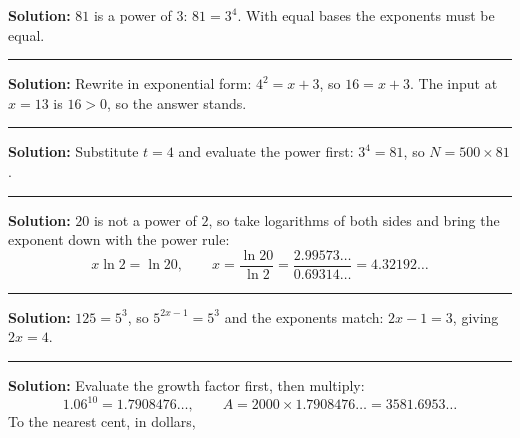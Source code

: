 \documentclass[12pt]{article}
\begin{document}



\textbf{Solution:} $81$ is a power of $3$: $81 = 3^4$. With equal bases the
exponents must be equal. 

\vspace{0.2cm}\noindent\rule{\linewidth}{0.2pt}\vspace{0.2cm}


\textbf{Solution:} Rewrite in exponential form: $4^2 = x + 3$, so
$16 = x + 3$. The input at $x = 13$ is $16 > 0$, so the answer stands.

\vspace{0.2cm}\noindent\rule{\linewidth}{0.2pt}\vspace{0.2cm}


\textbf{Solution:} Substitute $t = 4$ and evaluate the power first:
$3^4 = 81$, so $N = 500 \times 81$. 

\vspace{0.2cm}\noindent\rule{\linewidth}{0.2pt}\vspace{0.2cm}


\textbf{Solution:} $20$ is not a power of $2$, so take logarithms of both sides
and bring the exponent down with the power rule:
\[ x\ln 2 = \ln 20 , \qquad x = \frac{\ln 20}{\ln 2} = \frac{2.99573\ldots}{0.69314\ldots}
   = 4.32192\ldots \]

\vspace{0.2cm}\noindent\rule{\linewidth}{0.2pt}\vspace{0.2cm}


\textbf{Solution:} $125 = 5^3$, so $5^{2x-1} = 5^3$ and the exponents match:
$2x - 1 = 3$, giving $2x = 4$. 

\vspace{0.2cm}\noindent\rule{\linewidth}{0.2pt}\vspace{0.2cm}


\textbf{Solution:} Evaluate the growth factor first, then multiply:
\[ 1.06^{10} = 1.7908476\ldots , \qquad A = 2000 \times 1.7908476\ldots
   = 3581.6953\ldots \]
To the nearest cent, in dollars, 
\end{document}
